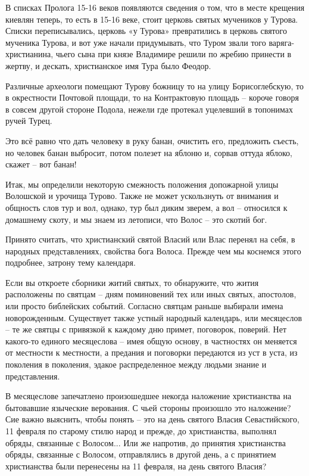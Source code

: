 \documentclass[a5paper,11pt,openany]{article}
\begin{document}
 В списках Пролога 15-16 веков появляются сведения о том, что в месте крещения киевлян теперь, то есть в 15-16 веке, стоит церковь святых мучеников у Турова. Списки переписывались, церковь «у Турова» превратились в церковь святого мученика Турова, и вот уже начали придумывать, что Туром звали того варяга-христианина, чьего сына при князе Владимире решили по жребию принести в жертву, и дескать, христианское имя Тура было Феодор.

   Различные археологи помещают Турову божницу то на улицу Борисоглебскую, то в окрестности Почтовой площади, то на Контрактовую площадь – короче говоря в совсем другой стороне Подола, нежели где протекал уцелевший в топонимах ручей Турец.

Это всё равно что дать человеку в руку банан, очистить его, предложить съесть, но человек банан выбросит, потом полезет на яблоню и, сорвав оттуда яблоко, скажет – вот банан!

   Итак, мы определили некоторую смежность положения допожарной улицы Волошской и урочища Турово. Также не может ускользнуть от внимания и общность слов тур и вол, однако, тур был диким зверем, а вол – относился к домашнему скоту, и мы знаем из летописи, что Волос – это скотий бог.

   Принято считать, что христианский святой Власий или Влас перенял на себя, в народных представлениях, свойства бога Волоса. Прежде чем мы коснемся этого подробнее, затрону тему календаря.


    Если вы откроете сборники житий святых, то обнаружите, что жития расположены по святцам – дням поминовений тех или иных святых, апостолов, или просто библейских событий. Согласно святцам раньше выбирали имена новорожденным. Существует также устный народный календарь, или месяцеслов – те же святцы с привязкой к каждому дню примет, поговорок, поверий. Нет какого-то единого месяцеслова – имея общую основу, в частностях он меняется от местности к местности, а предания и поговорки передаются из уст в уста, из поколения в поколения, эдакое распределенное между людьми знание и представления.

 В месяцеслове запечатлено произошедшее некогда наложение христианства на бытовавшие языческие верования. С чьей стороны произошло это наложение? Сие важно выяснить, чтобы понять – это на день святого Власия Севастийского, 11 февраля по старому стилю народ и прежде, до христианства, выполнял обряды, связанные с Волосом... Или же напротив, до принятия христианства обряды, связанные с Волосом, отправлялись в другой день, а с принятием христианства были перенесены на 11 февраля, на день святого Власия?
\end{document}
